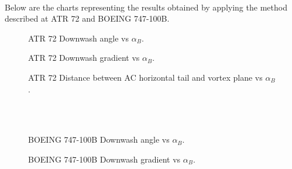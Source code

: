 %
%
%
%
%
%	                     



\noindent \\

Below are the charts representing the results obtained by applying the method described at ATR 72 and BOEING 747-100B.

\begin{figure}[H]
\centering

\caption{ATR 72 Downwash angle vs $\alpha_{B}$.}
\label{fig:epsilon}
\end{figure}

\begin{figure}[H]
\centering

\caption{ATR 72 Downwash gradient vs $\alpha_{B}$.}
\label{fig:downwashgradATR}
\end{figure}

\begin{figure}[H]
\centering

\caption{ATR 72 Distance between AC horizontal tail and vortex plane vs $\alpha_{B}$.}
\label{fig:zATR}
\end{figure}

\noindent \\ \\ 

\begin{figure}[H]
\centering

\caption{BOEING 747-100B Downwash angle vs $\alpha_{B}$.}
\label{fig:epsilonboeing}
\end{figure}

\begin{figure}[H]
\centering

\caption{BOEING 747-100B  Downwash gradient vs $\alpha_{B}$.}
\label{fig:downwashgradboeing}
\end{figure}

